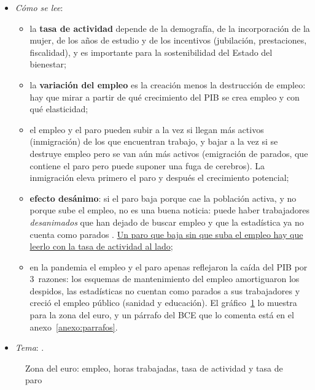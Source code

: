 \documentclass[11pt]{article}
\begin{document}
\begin{itemize}
\item \emph{Cómo se lee}:
  \begin{itemize}
  \item la \textbf{tasa de actividad} depende de la demografía, de la incorporación de la mujer, de los años de estudio y de los incentivos (jubilación, prestaciones, fiscalidad), y es importante para la sostenibilidad del Estado del bienestar;
  \item la \textbf{variación del empleo} es la creación menos la destrucción de empleo: hay que mirar a partir de qué crecimiento del PIB se crea empleo y con qué elasticidad;
  \item el empleo y el paro pueden subir a la vez si llegan más activos (inmigración) de los que encuentran trabajo, y bajar a la vez si se destruye empleo pero se van aún más activos (emigración de parados, que contiene el paro pero puede suponer una fuga de cerebros). La inmigración eleva primero el paro y después el crecimiento potencial;
  \item \textbf{efecto desánimo}: si el paro baja porque cae la población activa, y no porque sube el empleo, no es una buena noticia: puede haber trabajadores \emph{desanimados} que han dejado de buscar empleo y que la estadística ya no cuenta como parados \parencite{INE2025EPA}. \uline{Un paro que baja sin que suba el empleo hay que leerlo con la tasa de actividad al lado};
  \item en la pandemia el empleo y el paro apenas reflejaron la caída del PIB por 3~razones: los esquemas de mantenimiento del empleo amortiguaron los despidos, las estadísticas no cuentan como parados a sus trabajadores y creció el empleo público (sanidad y educación). El gráfico~\ref{fig:empleo-horas} lo muestra para la zona del euro, y un párrafo del BCE que lo comenta está en el anexo~\ref{anexo:parrafos}.
  \end{itemize}
\item \emph{Tema}:  .
\end{itemize}

\begin{figure}[!htb]
\centering
\caption{Zona del euro: empleo, horas trabajadas, tasa de actividad y tasa de paro}\label{fig:empleo-horas}
\end{figure}
\end{document}
